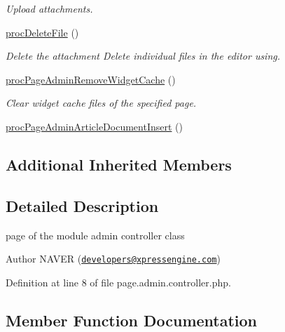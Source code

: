 \begin{DoxyCompactItemize}
\begin{DoxyCompactList}\small\item\em Upload attachments. \end{DoxyCompactList}\item 
\hyperlink{classpageAdminController_a79f90d79016b9550455e80c2ab6f72d8}{proc\+Delete\+File} ()
\begin{DoxyCompactList}\small\item\em Delete the attachment Delete individual files in the editor using. \end{DoxyCompactList}\item 
\hyperlink{classpageAdminController_a06b9c3a3052e15aa783e319c49ea8039}{proc\+Page\+Admin\+Remove\+Widget\+Cache} ()
\begin{DoxyCompactList}\small\item\em Clear widget cache files of the specified page. \end{DoxyCompactList}\item 
\hyperlink{classpageAdminController_a5ffba4fec0a2c2bd86b4c67fcaff61e8}{proc\+Page\+Admin\+Article\+Document\+Insert} ()
\end{DoxyCompactItemize}
\subsection*{Additional Inherited Members}


\subsection{Detailed Description}
page of the module admin controller class 

\begin{DoxyAuthor}{Author}
N\+A\+V\+ER (\href{mailto:developers@xpressengine.com}{\tt developers@xpressengine.\+com}) 
\end{DoxyAuthor}


Definition at line 8 of file page.\+admin.\+controller.\+php.



\subsection{Member Function Documentation}
\mbox{\label{classpageAdminController_a404c9597cbe5970e977b4d756ec3a38a}} 
